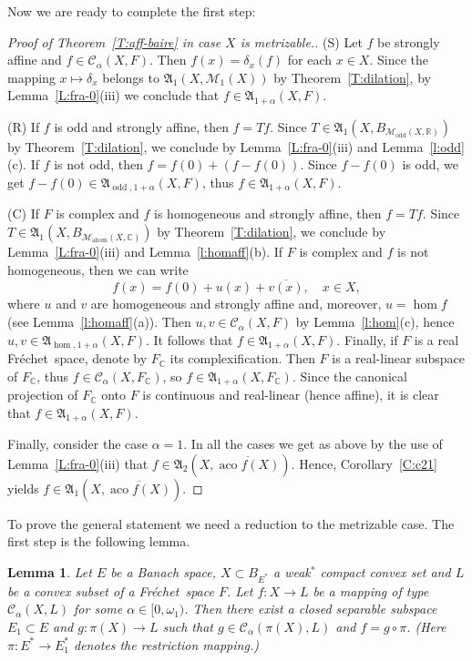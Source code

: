 \documentclass{amsart}
\numberwithin{equation}{section}
\newtheorem{lemma}[thm]{Lemma}
\theoremstyle{definition}
\def\fra{\mathfrak{A}}
\def\C{\mathcal C}
\def\M{\mathcal M}
\def\ce{\mathbb C}
\def\aco{\operatorname{aco}}
\def\er{\mathbb R}
\def\ov{\overline}
\def\hom{\operatorname{hom}}
\def\ahom{\operatorname{ahom}}
\def\odd{\operatorname{odd}}
\newcommand{\fr}{Fr\'echet\ }
\begin{document}
Now we are ready to complete the first step:

\begin{proof}[Proof of Theorem~\ref{T:aff-baire} in case $X$ is metrizable.]

(S) Let $f$ be strongly affine and $f\in\C_\alpha(X,F)$. Then $f(x)=\delta_x(f)$ for each $x\in X$. Since the mapping $x\mapsto\delta_x$ belongs to $\fra_1(X,\M_1(X))$ by Theorem~\ref{T:dilation},  by Lemma~\ref{L:fra-0}(iii) we conclude that $f\in\fra_{1+\alpha}(X,F)$.

(R) If $f$ is odd and strongly affine, then $f=Tf$. Since $T\in\fra_1(X,B_{\M_{\odd}(X,\er)})$ by  Theorem~\ref{T:dilation}, we conclude by Lemma~\ref{L:fra-0}(iii) and Lemma~\ref{l:odd}(c). If $f$ is not odd, then $f=f(0)+(f-f(0))$. Since $f-f(0)$ is odd, we get $f-f(0)\in\fra_{\odd,1+\alpha}(X,F)$, thus $f\in\fra_{1+\alpha}(X,F)$.

(C) If $F$ is complex and $f$ is homogeneous and strongly affine, then $f=Tf$. Since $T\in\fra_1(X,B_{\M_{\ahom}(X,\ce)})$ by  Theorem~\ref{T:dilation}, we conclude by Lemma~\ref{L:fra-0}(iii) and Lemma~\ref{l:homaff}(b). If $F$ is complex and $f$ is not homogeneous, then we can write
$$f(x)=f(0)+u(x)+\ov{v(x)},\quad x\in X,$$
where $u$ and $v$ are homogeneous and strongly affine and, moreover, $u=\hom f$ (see Lemma~\ref{l:homaff}(a)). Then $u,v\in\C_\alpha(X,F)$ by Lemma~\ref{l:hom}(c),
hence $u,v\in \fra_{\hom,1+\alpha}(X,F)$. It follows that $f\in\fra_{1+\alpha}(X,F)$. Finally, if $F$ is a real \fr space, denote by $F_{\ce}$ its complexification. Then $F$ is a real-linear subspace of $F_{\ce}$, thus $f\in\C_\alpha(X,F_{\ce})$, so $f\in\fra_{1+\alpha}(X,F_{\ce})$. Since the canonical projection of $F_{\ce}$ onto $F$ is continuous and real-linear (hence affine), it is clear that $f\in\fra_{1+\alpha}(X,F)$.

\smallskip

Finally, consider the case $\alpha=1$. In all the cases we get as above by the use of Lemma~\ref{L:fra-0}(iii) that $f\in\fra_2(X,\ov{\aco f(X)})$. Hence, Corollary~\ref{C:c21} yields $f\in\fra_1(X,\ov{\aco f(X)})$.
\end{proof}


To prove the general statement we need a reduction to the metrizable case. The first step is the following lemma.



\begin{lemma}
\label{selekce5}
Let $E$ be a Banach space, $X\subset B_{E^*}$ a weak$^*$ compact convex set and $L$ be a convex subset of a \fr space $F$.
Let $f\colon X\to L$ be a mapping of type $\C_\alpha(X,L)$ for some $\alpha\in [0,\omega_1)$. Then there exist a closed separable subspace
$E_1\subset E$ and $g\colon \pi(X)\to L$ such that $g\in \C_\alpha(\pi(X),L)$ and $f=g\circ \pi$. (Here $\pi\colon E^*\to {E_1^*}$ denotes the restriction mapping.)
\end{lemma}
\end{document}

